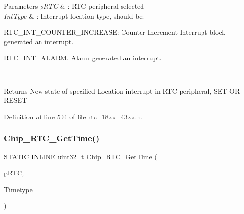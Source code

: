 \begin{DoxyParams}{Parameters}
{\em p\+R\+TC} & \+: R\+TC peripheral selected \\
\hline
{\em Int\+Type} & \+: Interrupt location type, should be\+:
\begin{DoxyItemize}
\item R\+T\+C\+\_\+\+I\+N\+T\+\_\+\+C\+O\+U\+N\+T\+E\+R\+\_\+\+I\+N\+C\+R\+E\+A\+SE\+: Counter Increment Interrupt block generated an interrupt.
\item R\+T\+C\+\_\+\+I\+N\+T\+\_\+\+A\+L\+A\+RM\+: Alarm generated an interrupt. 
\end{DoxyItemize}\\
\hline
\end{DoxyParams}
\begin{DoxyReturn}{Returns}
New state of specified Location interrupt in R\+TC peripheral, S\+ET OR R\+E\+S\+ET 
\end{DoxyReturn}


Definition at line 504 of file rtc\+\_\+18xx\+\_\+43xx.\+h.

\mbox{\label{group___r_t_c__18_x_x__43_x_x_ga661c73c8fce7243b30a207ad7cbee59b}} 
\subsubsection{\texorpdfstring{Chip\+\_\+\+R\+T\+C\+\_\+\+Get\+Time()}{Chip\_RTC\_GetTime()}}
{\footnotesize\ttfamily \hyperlink{group___l_p_c___types___public___macros_ga10b2d890d871e1489bb02b7e70d9bdfb}{S\+T\+A\+T\+IC} \hyperlink{spifi__18xx__43xx_8h_a2eb6f9e0395b47b8d5e3eeae4fe0c116}{I\+N\+L\+I\+NE} uint32\+\_\+t Chip\+\_\+\+R\+T\+C\+\_\+\+Get\+Time (\begin{DoxyParamCaption}\item[{\hyperlink{struct_l_p_c___r_t_c___t}{L\+P\+C\+\_\+\+R\+T\+C\+\_\+T} $\ast$}]{p\+R\+TC,  }\item[{\hyperlink{group___r_t_c__18_x_x__43_x_x_ga8144898fe628404d396db06dc8aac0e0}{R\+T\+C\+\_\+\+T\+I\+M\+E\+I\+N\+D\+E\+X\+\_\+T}}]{Timetype }\end{DoxyParamCaption})}



